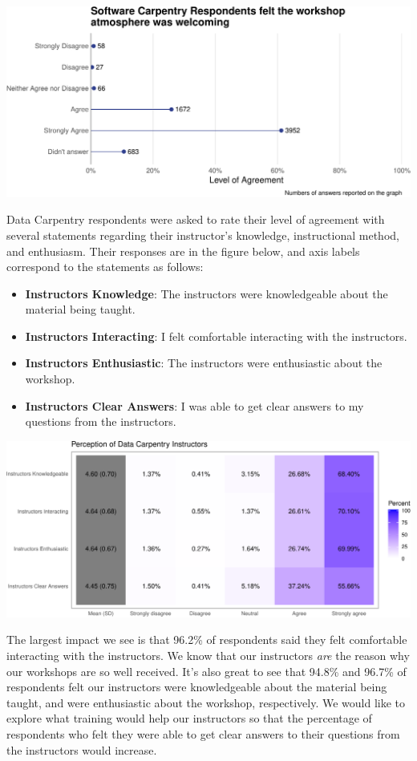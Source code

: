 \documentclass[]{article}
\providecommand{\tightlist}{%
  \setlength{\itemsep}{0pt}\setlength{\parskip}{0pt}}
\begin{document}
\includegraphics[width=720]{figures/swc-post-workshop-environment-1}

Data Carpentry respondents were asked to rate their level of agreement
with several statements regarding their instructor's knowledge,
instructional method, and enthusiasm. Their responses are in the figure
below, and axis labels correspond to the statements as follows:

\begin{itemize}
\tightlist
\item
  \textbf{Instructors Knowledge}: The instructors were knowledgeable
  about the material being taught.
\item
  \textbf{Instructors Interacting}: I felt comfortable interacting with
  the instructors.
\item
  \textbf{Instructors Enthusiastic}: The instructors were enthusiastic
  about the workshop.
\item
  \textbf{Instructors Clear Answers}: I was able to get clear answers to
  my questions from the instructors.
\end{itemize}

\includegraphics[width=720]{figures/dc-perception-instructors-heatmap-1}

The largest impact we see is that 96.2\% of respondents said they felt
comfortable interacting with the instructors. We know that our
instructors \emph{are} the reason why our workshops are so well
received. It's also great to see that 94.8\% and 96.7\% of respondents
felt our instructors were knowledgeable about the material being taught,
and were enthusiastic about the workshop, respectively. We would like to
explore what training would help our instructors so that the percentage
of respondents who felt they were able to get clear answers to their
questions from the instructors would increase.
\end{document}
